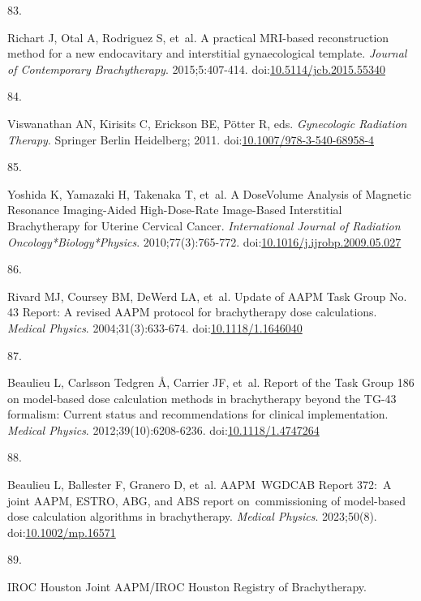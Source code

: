 \documentclass[
  a4paper,
]{scrreprt}
\newlength{\cslhangindent}
\newlength{\csllabelwidth}
\newlength{\cslentryspacingunit} %
\newenvironment{CSLReferences}[2] %
 {%
  \setlength{\parindent}{0pt}
  \ifodd #1
  \let\oldpar\par
  \def\par{\hangindent=\cslhangindent\oldpar}
  \fi
  \setlength{\parskip}{#2\cslentryspacingunit}
 }%
 {}
\newcommand{\CSLLeftMargin}[1]{\parbox[t]{\csllabelwidth}{#1}}
\newcommand{\CSLRightInline}[1]{\parbox[t]{\linewidth - \csllabelwidth}{#1}\break}
\begin{document}
\begin{CSLReferences}{0}{0}
\leavevmode{}%
\CSLLeftMargin{83. }%
\CSLRightInline{Richart J, Otal A, Rodriguez S, et~al. A practical
MRI-based reconstruction method for a new endocavitary and interstitial
gynaecological template. \emph{Journal of Contemporary Brachytherapy}.
2015;5:407-414.
doi:\href{https://doi.org/10.5114/jcb.2015.55340}{10.5114/jcb.2015.55340}}

\leavevmode{}%
\CSLLeftMargin{84. }%
\CSLRightInline{Viswanathan AN, Kirisits C, Erickson BE, Pötter R, eds.
\emph{Gynecologic Radiation Therapy}. Springer Berlin Heidelberg; 2011.
doi:\href{https://doi.org/10.1007/978-3-540-68958-4}{10.1007/978-3-540-68958-4}}

\leavevmode{}%
\CSLLeftMargin{85. }%
\CSLRightInline{Yoshida K, Yamazaki H, Takenaka T, et~al. A
Dose{\textendash}Volume Analysis of Magnetic Resonance Imaging-Aided
High-Dose-Rate Image-Based Interstitial Brachytherapy for Uterine
Cervical Cancer. \emph{International Journal of Radiation
Oncology*Biology*Physics}. 2010;77(3):765-772.
doi:\href{https://doi.org/10.1016/j.ijrobp.2009.05.027}{10.1016/j.ijrobp.2009.05.027}}

\leavevmode{}%
\CSLLeftMargin{86. }%
\CSLRightInline{Rivard MJ, Coursey BM, DeWerd LA, et~al. Update of AAPM
Task Group No. 43 Report: A revised AAPM protocol for brachytherapy dose
calculations. \emph{Medical Physics}. 2004;31(3):633-674.
doi:\href{https://doi.org/10.1118/1.1646040}{10.1118/1.1646040}}

\leavevmode{}%
\CSLLeftMargin{87. }%
\CSLRightInline{Beaulieu L, Carlsson Tedgren Å, Carrier JF, et~al.
Report of the Task Group 186 on model{-}based dose calculation methods
in brachytherapy beyond the TG{-}43 formalism: Current status and
recommendations for clinical implementation. \emph{Medical Physics}.
2012;39(10):6208-6236.
doi:\href{https://doi.org/10.1118/1.4747264}{10.1118/1.4747264}}

\leavevmode{}%
\CSLLeftMargin{88. }%
\CSLRightInline{Beaulieu L, Ballester F, Granero D, et~al. AAPM~WGDCAB
Report 372:~A joint AAPM, ESTRO, ABG, and ABS report on~commissioning of
model{-}based dose calculation algorithms in brachytherapy.
\emph{Medical Physics}. 2023;50(8).
doi:\href{https://doi.org/10.1002/mp.16571}{10.1002/mp.16571}}

\leavevmode{}%
\CSLLeftMargin{89. }%
\CSLRightInline{IROC Houston Joint AAPM/IROC Houston Registry of
Brachytherapy.}


\end{CSLReferences}
\end{document}
